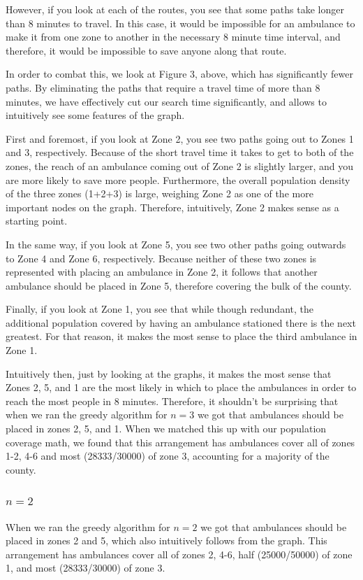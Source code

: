 \documentclass[notitlepage, 12pt]{article}
\begin{document}
However, if you look at each of the routes, you see that some paths take longer than 8 minutes to travel. In this case, it would be impossible for an ambulance to make it from one zone to another in the necessary 8 minute time interval, and therefore, it would be impossible to save anyone along that route.

In order to combat this, we look at Figure 3, above, which has significantly fewer paths. By eliminating the paths that require a travel time of more than 8 minutes, we have effectively cut our search time significantly, and allows to intuitively see some features of the graph.

First and foremost, if you look at Zone 2, you see two paths going out to Zones 1 and 3, respectively. Because of the short travel time it takes to get to both of the zones, the reach of an ambulance coming out of Zone 2 is slightly larger, and you are more likely to save more people. Furthermore, the overall population density of the three zones (1+2+3) is large, weighing Zone 2 as one of the more important nodes on the graph. Therefore, intuitively, Zone 2 makes sense as a starting point.

In the same way, if you look at Zone 5, you see two other paths going outwards to Zone 4 and Zone 6, respectively. Because neither of these two zones is represented with placing an ambulance in Zone 2, it follows that another ambulance should be placed in Zone 5, therefore covering the bulk of the county.

Finally, if you look at Zone 1, you see that while though redundant, the additional population covered by having an ambulance stationed there is the next greatest. For that reason, it makes the most sense to place the third ambulance in Zone 1.

Intuitively then, just by looking at the graphs, it makes the most sense that Zones 2, 5, and 1 are the most likely in which to place the ambulances in order to reach the most people in 8 minutes. Therefore, it shouldn't be surprising that when we ran the greedy algorithm for $n=3$ we got that ambulances should be placed in zones
2, 5, and 1. When we matched this up with our population coverage math, we found that this arrangement has ambulances cover all of zones 1-2, 4-6 and most (28333/30000) of zone 3, accounting for a majority of the county.

\subsubsection{$n=2$}
When we ran the greedy algorithm for $n=2$ we got that ambulances should be placed in zones
2 and 5, which also intuitively follows from the graph. This arrangement has ambulances cover all of zones 2, 4-6, half (25000/50000) of zone 1, and most (28333/30000) of zone 3.
\end{document}
